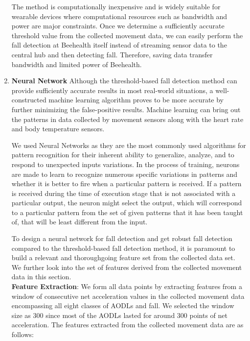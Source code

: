 \begin{enumerate}
The method is computationally inexpensive and is widely suitable for wearable devices where computational resources such as bandwidth and power are major constraints. Once we determine a sufficiently accurate threshold value from the collected movement data, we can easily perform the fall detection at Beehealth itself instead of streaming sensor data to the central hub and then detecting fall. Therefore, saving data transfer bandwidth and limited power of Beehealth.

\item \textbf{Neural Network}
Although the threshold-based fall detection method can provide sufficiently accurate results in most real-world situations, a well-constructed machine learning algorithm proves to be more accurate by further minimizing the false-positive results. Machine learning can bring out the patterns in data collected by movement sensors along with the heart rate and body temperature sensors.

We used Neural Networks as they are the most commonly used algorithms for pattern recognition for their inherent ability to generalize, analyze, and to respond to unexpected inputs variations. In the process of training, neurons are made to learn to recognize numerous specific variations in patterns and whether it is better to fire when a particular pattern is received. If a pattern is received during the time of execution stage that is not associated with a particular output, the neuron might select the output, which will correspond to a particular pattern from the set of given patterns that it has been taught of, that will be least different from the input.

To design a neural network for fall detection and get robust fall detection compared to the threshold-based fall detection method, it is paramount to build a relevant and thoroughgoing feature set from the collected data set. We further look into the set of features derived from the collected movement data in this section.\\

\textbf{Feature Extraction}:
We form all data points by extracting features from a window of consecutive net acceleration values in the collected movement data encompassing all eight classes of AODLs and fall. We selected the window size as 300 since most of the AODLs lasted for around 300 points of net acceleration. The features extracted from the collected movement data are as follows:


\end{enumerate}
